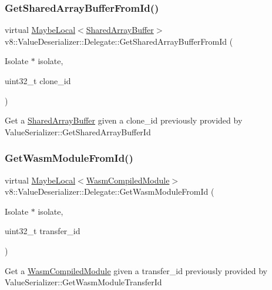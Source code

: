 \subsubsection{\texorpdfstring{Get\+Shared\+Array\+Buffer\+From\+Id()}{GetSharedArrayBufferFromId()}}
{\footnotesize\ttfamily virtual \mbox{\hyperlink{classv8_1_1MaybeLocal}{Maybe\+Local}}$<$\mbox{\hyperlink{classv8_1_1SharedArrayBuffer}{Shared\+Array\+Buffer}}$>$ v8\+::\+Value\+Deserializer\+::\+Delegate\+::\+Get\+Shared\+Array\+Buffer\+From\+Id (\begin{DoxyParamCaption}\item[{Isolate $\ast$}]{isolate,  }\item[{uint32\+\_\+t}]{clone\+\_\+id }\end{DoxyParamCaption})\hspace{0.3cm}{\ttfamily [virtual]}}

Get a \mbox{\hyperlink{classv8_1_1SharedArrayBuffer}{Shared\+Array\+Buffer}} given a clone\+\_\+id previously provided by Value\+Serializer\+::\+Get\+Shared\+Array\+Buffer\+Id \mbox{\label{classv8_1_1ValueDeserializer_1_1Delegate_adcaa80ce590bbcfaac4929a9e7b49249}} 
\subsubsection{\texorpdfstring{Get\+Wasm\+Module\+From\+Id()}{GetWasmModuleFromId()}}
{\footnotesize\ttfamily virtual \mbox{\hyperlink{classv8_1_1MaybeLocal}{Maybe\+Local}}$<$\mbox{\hyperlink{classv8_1_1WasmCompiledModule}{Wasm\+Compiled\+Module}}$>$ v8\+::\+Value\+Deserializer\+::\+Delegate\+::\+Get\+Wasm\+Module\+From\+Id (\begin{DoxyParamCaption}\item[{Isolate $\ast$}]{isolate,  }\item[{uint32\+\_\+t}]{transfer\+\_\+id }\end{DoxyParamCaption})\hspace{0.3cm}{\ttfamily [virtual]}}

Get a \mbox{\hyperlink{classv8_1_1WasmCompiledModule}{Wasm\+Compiled\+Module}} given a transfer\+\_\+id previously provided by Value\+Serializer\+::\+Get\+Wasm\+Module\+Transfer\+Id \mbox{\label{classv8_1_1ValueDeserializer_1_1Delegate_a8b06c19cba7e80c3c5271b0a2ca88a8a}} 

